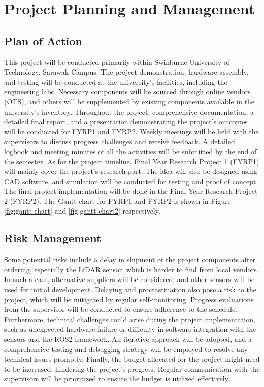 \section{Project Planning and Management}


\subsection{Plan of Action}
This project will be conducted primarily within Swinburne University of Technology, Sarawak Campus. The project demonstration, 
hardware assembly, and testing will be conducted at the university's facilities, including the engineering labs. Necessary 
components will be sourced through online vendors (OTS), and others will be supplemented by existing components available in the university's
inventory. Throughout the project, comprehensive documentation, a detailed final report, and a presentation 
demonstrating the project's outcomes will be conducted for FYRP1 and FYRP2. Weekly meetings will be held with the supervisors 
to discuss progress challenges and receive feedback. A detailed logbook and meeting minutes of all the activities will 
be submitted by the end of the semester. As for the project timeline, Final Year Research Project 1 (FYRP1) will mainly cover the project's research part. The idea will also
be designed using CAD software, and simulation will be conducted for testing and proof of concept. The final project implementation
will be done in the Final Year Research Project 2 (FYRP2). The Gantt chart for FYRP1 and FYRP2 is shown in Figure \ref{fig:gantt-chart} and \ref{fig:gantt-chart2} respectively.


\subsection{Risk Management}
Some potential risks include a delay in shipment of the project components after ordering, especially the LiDAR sensor, which
is harder to find from local vendors. In such a case, alternative suppliers will be considered, and other sensors 
will be used for initial development. Delaying and procrastination also pose a risk to the project, which will be mitigated by regular
self-monitoring. Progress evaluations from the supervisor will be conducted to ensure adherence to the schedule. Furthermore,  
technical challenges could arise during the project implementation, such as unexpected hardware failure or difficulty in software integration with 
the sensors and the ROS2 framework. An iterative approach will be adopted, and a comprehensive testing and debugging strategy will 
be employed to resolve any technical issues promptly. Finally, the budget allocated for the project might need to be increased, hindering the project's progress. Regular communication with the supervisors will be prioritized to ensure the budget is utilized effectively.


